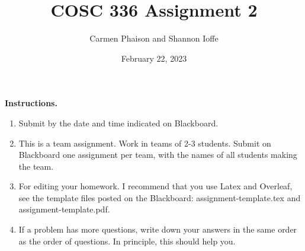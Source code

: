 \documentclass[11pt]{article}
\title{COSC 336 Assignment 2}
\author{Carmen Phaison and Shannon Ioffe}
\date{February 22, 2023}
\begin{document}
\vline

\textbf{Instructions.}
\begin{enumerate}
\item Submit by the date and time indicated on Blackboard. 

\item This is a team assignment. Work in teams of 2-3 students.  Submit on Blackboard one assignment per team, with the names of all students making the team.


\item  For editing your homework. I recommend that you use Latex and Overleaf, see the template files posted on the Blackboard: assignment-template.tex and assignment-template.pdf.
	   
	   \item If a problem has more questions, write down your answers in the same order as the order of questions. In principle, this should help you.

\end{enumerate}
\bigskip
\end{document}
